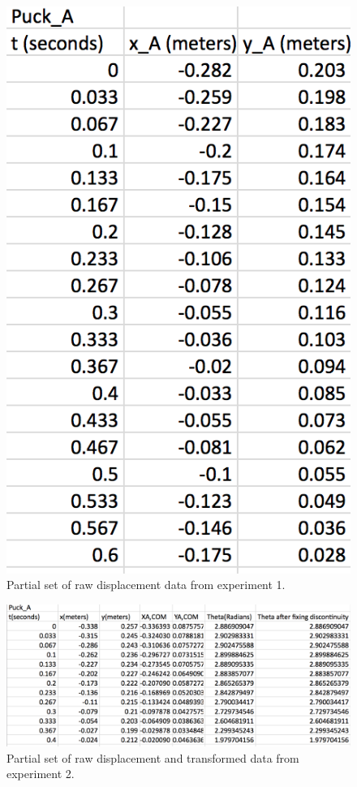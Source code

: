 \documentclass[11pt]{article}
\begin{document}
\begin{figure}[h]
\centering
\includegraphics[width=.4\textwidth]{exp1.png}
\caption{Partial set of raw displacement data from experiment 1.}
\end{figure}

\begin{figure}[h]
\centering
\includegraphics[width=.8\textwidth]{exp2.png}
\caption{Partial set of raw displacement and transformed data from experiment 2.}
\end{figure}




\end{document}
